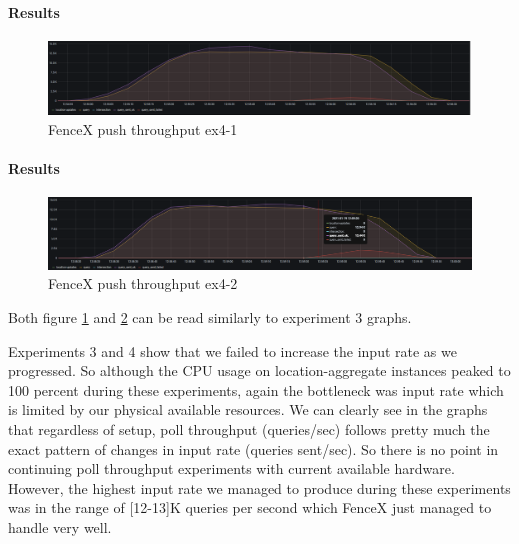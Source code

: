 \documentclass[a4]{report}
\begin{document}
        \paragraph{Results}
        \begin{figure}[ht]
            \caption{FenceX push throughput ex4-1}
            \label{fig:ex4-1}
            \includegraphics[scale=0.4]{images/evaluation/ex4-benchmarking(19,10).png}
        \end{figure}

        \paragraph{Results}
        \begin{figure}[ht]
            \caption{FenceX push throughput ex4-2}
            \label{fig:ex4-2}
            \includegraphics[scale=0.4]{images/evaluation/ex4-benchmarking(22,10).png}
        \end{figure}

        Both figure \ref{fig:ex4-1} and \ref{fig:ex4-2} can be read similarly to experiment 3 graphs.

        Experiments 3 and 4 show that we failed to increase the input rate as we progressed.
        So although the CPU usage on location-aggregate instances peaked to 100 percent during these experiments,
        again the bottleneck was input rate which is limited by our physical available resources.
        We can clearly see in the graphs that regardless of setup, poll throughput (queries/sec) follows pretty
        much the exact pattern of changes in input rate (queries sent/sec).
        So there is no point in continuing poll throughput experiments with current available hardware.
        However, the highest input rate we managed to produce during these experiments was in the range of [12-13]K queries
        per second which FenceX just managed to handle very well.
\end{document}
